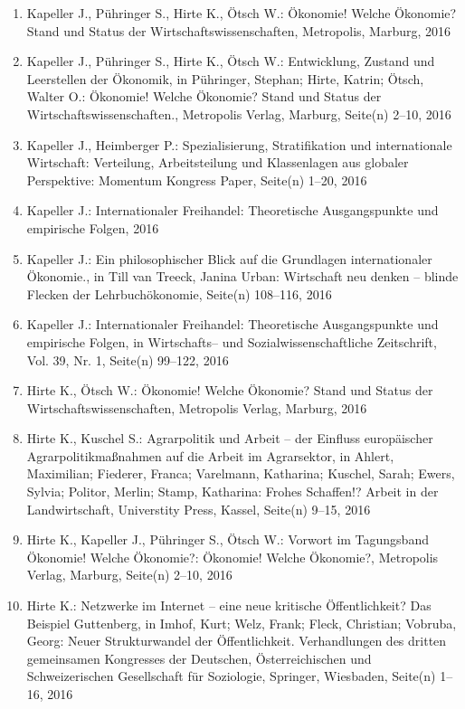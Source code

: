 \begin{enumerate}
	 \item Kapeller J., Pühringer S., Hirte K., Ötsch W.: Ökonomie! Welche Ökonomie? Stand und Status der Wirtschaftswissenschaften, Metropolis, Marburg, 2016
	 \item Kapeller J., Pühringer S., Hirte K., Ötsch W.: Entwicklung, Zustand und Leerstellen der Ökonomik, in Pühringer, Stephan; Hirte, Katrin; Ötsch, Walter O.: Ökonomie! Welche Ökonomie? Stand und Status der Wirtschaftswissenschaften., Metropolis Verlag, Marburg, Seite(n) 2--10, 2016
	 \item Kapeller J., Heimberger P.: Spezialisierung, Stratifikation und internationale Wirtschaft: Verteilung, Arbeitsteilung und Klassenlagen aus globaler Perspektive: Momentum Kongress Paper, Seite(n) 1--20, 2016
	 \item Kapeller J.: Internationaler Freihandel: Theoretische Ausgangspunkte und empirische Folgen, 2016
	 \item Kapeller J.: Ein philosophischer Blick auf die Grundlagen internationaler Ökonomie., in Till van Treeck, Janina Urban: Wirtschaft neu denken – blinde Flecken der Lehrbuchökonomie, Seite(n) 108--116, 2016
	 \item Kapeller J.: Internationaler Freihandel: Theoretische Ausgangspunkte und empirische Folgen, in Wirtschafts-- und Sozialwissenschaftliche Zeitschrift, Vol. 39, Nr. 1, Seite(n) 99--122, 2016
	 \item Hirte K., Ötsch W.: Ökonomie! Welche Ökonomie? Stand und Status der Wirtschaftswissenschaften, Metropolis Verlag, Marburg, 2016
	 \item Hirte K., Kuschel S.: Agrarpolitik und Arbeit – der Einfluss europäischer Agrarpolitikmaßnahmen auf die Arbeit im Agrarsektor, in Ahlert, Maximilian; Fiederer, Franca; Varelmann, Katharina; Kuschel, Sarah; Ewers, Sylvia; Politor, Merlin; Stamp, Katharina: Frohes Schaffen!? Arbeit in der Landwirtschaft, Universtity Press, Kassel, Seite(n) 9--15, 2016
	 \item Hirte K., Kapeller J., Pühringer S., Ötsch W.: Vorwort im Tagungsband Ökonomie! Welche Ökonomie?: Ökonomie! Welche Ökonomie?, Metropolis Verlag, Marburg, Seite(n) 2--10, 2016
	 \item Hirte K.: Netzwerke im Internet – eine neue kritische Öffentlichkeit? Das Beispiel Guttenberg, in Imhof, Kurt; Welz, Frank; Fleck, Christian; Vobruba, Georg: Neuer Strukturwandel der Öffentlichkeit. Verhandlungen des dritten gemeinsamen Kongresses der Deutschen, Österreichischen und Schweizerischen Gesellschaft für Soziologie, Springer, Wiesbaden, Seite(n) 1--16, 2016

\end{enumerate}
